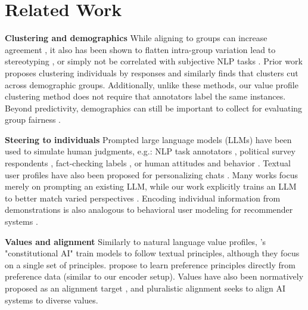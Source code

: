\documentclass[11pt]{article}
\begin{document}
\section{Related Work} \label{sec:relatedwork}

\textbf{Clustering and demographics} While aligning to groups can increase agreement \citep{chen2024spicaretrievingscenariospluralistic}, it also has been shown to flatten intra-group variation \citep{orlikowski-etal-2023-ecological, Wang2025} lead to stereotyping \citep{cheng-etal-2023-marked}, or simply not be correlated with subjective NLP tasks \citet{orlikowski2025demographicsfinetuninglargelanguage}. Prior work proposes clustering individuals by responses \citep{vitsakis2024voicescrowdsearchingclusters,li-etal-2024-steerability} and similarly finds that clusters cut across demographic groups. Additionally, unlike these methods, our value profile clustering method does not require that annotators label the same instances. Beyond predictivity, demographics can still be important to collect for evaluating group fairness \citep{aguirre2023selectingshotsdemographicfairness, kirk2024prismalignmentdatasetparticipatory}.

\textbf{Steering to individuals} Prompted large language models (LLMs) 
have been used
to simulate human judgments, e.g.:
NLP task annotators \citep{Bavaresco:2024}, political survey respondents \citep{argyle_busby_fulda_gubler_rytting_wingate_2023}, fact-checking labels \citep{de2024supernotes}, or human attitudes and behavior \citep{park2024generativeagentsimulations1000}. Textual user profiles have also been proposed for personalizing chats \citep{zhang-etal-2018-personalizing}. Many works focus merely on prompting an existing LLM, while our work explicitly trains an LLM to better match varied perspectives \citep{Gordon_2022, jiang2024languagemodelsreasonindividualistic}. Encoding individual information from demonstrations is also analogous to behavioral user modeling for recommender systems \citep{Radlinski:2022,ramos-etal-2024-transparent}.

\textbf{Values and alignment }
Similarly to natural language value profiles, \citet{bai2022constitutionalaiharmlessnessai}'s "constitutional AI" train models to follow textual principles, although they focus on a single set of principles. \citet{findeis2024inverseconstitutionalaicompressing} propose to learn preference principles directly from preference data (similar to our encoder setup). Values have also been normatively proposed as an alignment target \citep{gabriel2020artificial, klingefjord2024humanvaluesalignai}, and pluralistic alignment \citep{sorensen2024roadmappluralisticalignment} seeks to align AI systems to diverse values.
\end{document}
